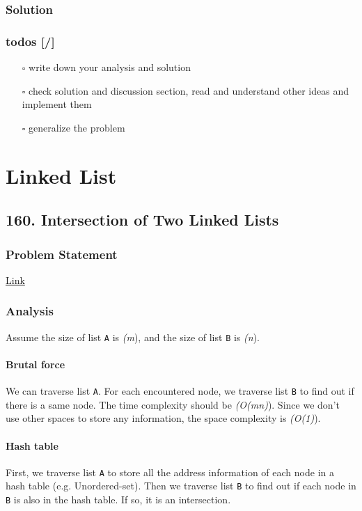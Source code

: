 \documentclass[12pt]{book}
\begin{document}
\section{Solution}
\label{sec:orge71012d}
\section{todos [/]}
\label{sec:org6184054}
\begin{itemize}
\item[{$\square$}] write down your analysis and solution
\item[{$\square$}] check solution and discussion section, read and understand other ideas and implement them
\item[{$\square$}] generalize the problem
\end{itemize}
\part{Linked List}
\label{sec:orgc7c22e0}
\chapter{160. Intersection of Two Linked Lists}
\label{sec:orgfff395f}
\section{Problem Statement}
\label{sec:orga182f0d}
\href{https://leetcode.com/problems/intersection-of-two-linked-lists/}{Link}
\section{Analysis}
\label{sec:org0e37333}
Assume the size of list \texttt{A} is \emph{(m}), and the size of list \texttt{B} is \emph{(n}).
\subsection{Brutal force}
\label{sec:orgc7570fb}
We can traverse list \texttt{A}. For each encountered node, we traverse list \texttt{B} to find out if there is a same node. The time complexity should be \emph{(O(mn)}). Since we don't use other spaces to store any information, the space complexity is \emph{(O(1)}).

\subsection{Hash table}
\label{sec:org0332e29}
First, we traverse list \texttt{A} to store all the address information of each node in a hash table (e.g. Unordered-set). Then we traverse list \texttt{B} to find out if each node in \texttt{B} is also in the hash table. If so, it is an intersection.
\end{document}
